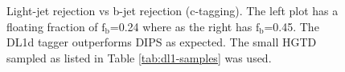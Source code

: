 \begin{figure}[h]
    \centering
    \qquad
    \caption{ Light-jet rejection vs b-jet rejection (c-tagging). The left plot has a floating fraction of $\textrm{f}_{\textrm{b}}$=0.24 where as the right has $\textrm{f}_{\textrm{b}}$=0.45. The DL1d
    tagger outperforms DIPS as expected. The small HGTD sampled as listed in Table \ref{tab:dl1-samples} was used. }
\label{fig:dl1d-ctag}
\end{figure}

